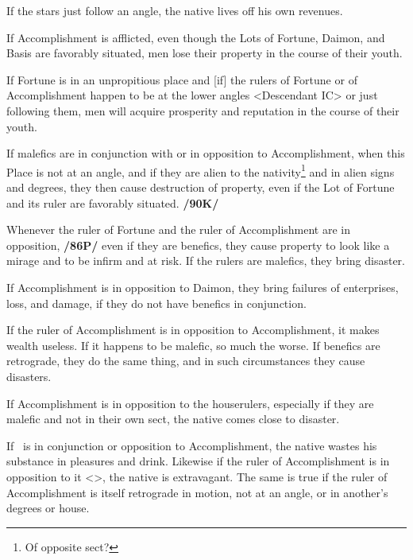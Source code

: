 If the stars just follow an angle, the native lives off his own revenues.

If Accomplishment is afflicted, even though the Lots of Fortune, Daimon, and Basis are favorably situated, men lose their property in the course of their youth. 

If Fortune is in an unpropitious place and [if] the rulers of Fortune or of Accomplishment happen to be at the lower angles <Descendant IC> or just following them, men will acquire prosperity and reputation in the course of their youth. 

If malefics are in conjunction with or in opposition to Accomplishment, when this Place is not at an angle, and if they are alien to the nativity\footnote{Of opposite sect?} and in alien signs and degrees, they then cause destruction of property, even if the Lot of Fortune and its ruler are favorably situated. \textbf{/90K/}

Whenever the ruler of Fortune and the ruler of Accomplishment are in opposition, \textbf{/86P/} even if they are benefics, they cause property to look like a mirage and to be infirm and at risk. If the rulers are malefics, they bring disaster. 

If Accomplishment is in opposition to Daimon, they bring failures of enterprises, loss, and damage, if they do not have benefics in conjunction. 

If the ruler of Accomplishment is in opposition to Accomplishment, it makes wealth useless. If it happens to be malefic, so much the worse. \mnbm If benefics are retrograde, they do the same thing, and in such circumstances they cause disasters. 

If Accomplishment is in opposition to the houserulers, especially if they are malefic and not in their own sect, the native comes close to disaster. 

If \Mars\, is in conjunction or opposition to Accomplishment, the native wastes his substance in pleasures and drink. Likewise if the ruler of Accomplishment is in
opposition to it <\Mars>, the native is extravagant. The same is true if the ruler of Accomplishment is itself retrograde in motion, not at an angle, or in another’s degrees or house.

\newpage